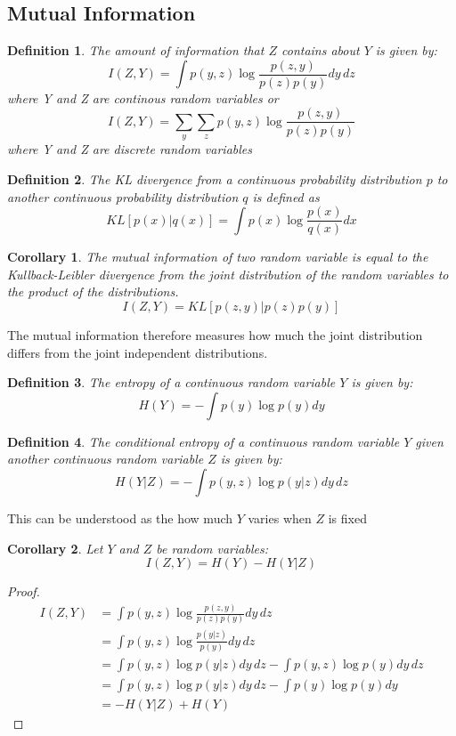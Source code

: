 \documentclass[10pt,oneside,openright]{report}
\newtheorem{definition}{Definition}
\newtheorem{corollary}{Corollary}
\begin{document}
\subsection{Mutual Information}

\begin{definition}
The amount of information that $Z$ contains about $Y$ is given by:
$$ I(Z, Y) = \int p(y, z) \log \frac{p(z, y)}{p(z)p(y)} dy\,dz $$ where Y and Z are continous random variables or 
 $$ I(Z, Y) = \sum_y \sum_z p(y, z) \log \frac{p(z, y)}{p(z)p(y)} $$ where Y and Z are discrete random variables 
\end{definition}

\begin{definition}
The KL divergence from a continuous probability distribution $p$ to another continuous probability distribution $q$ is defined as 
$$ KL[p(x)|q(x)] = \int p(x) \log \frac{p(x)}{q(x)} dx $$
\end{definition}

\begin{corollary}
The mutual information of two random variable is equal to the Kullback-Leibler divergence from the joint distribution of the random variables to the product of the distributions.
$$ I(Z, Y) = KL[p(z, y) | p(z)p(y)] $$
\end{corollary}
The mutual information therefore measures how much the joint distribution differs from the joint independent distributions. 

\begin{definition}
The entropy of a continuous random variable $Y$ is given by:
$$ H(Y)  = -\int p(y) \log p(y) dy $$
\end{definition}

\begin{definition}
The conditional entropy of a continuous random variable $Y$ given another continuous random variable $Z$ is given by:
$$ H(Y|Z)  = -\int p(y, z) \log p(y|z) dy\,dz $$
\end{definition}
This can be understood as the how much $Y$ varies when $Z$ is fixed

\begin{corollary}
Let $Y$ and $Z$ be random variables:
$$ I(Z, Y) = H(Y) - H(Y|Z)$$
\end{corollary}

\begin{proof}
\begin{align}
I(Z, Y) &= \int p(y, z) \log \frac{p(z, y)}{p(z)p(y)} dy\,dz\\
& = \int p(y, z) \log \frac{p(y|z)}{p(y)} dy\,dz \label{eq:mi_zy}\\
&= \int p(y, z) \log p(y|z) dy\,dz - \int p(y, z) \log p(y) dy\,dz\\ 
&= \int p(y, z) \log p(y|z) dy\,dz - \int p(y) \log p(y) dy\\ 
&= - H(Y|Z) + H(Y)
\end{align}
\end{proof}
\end{document}
